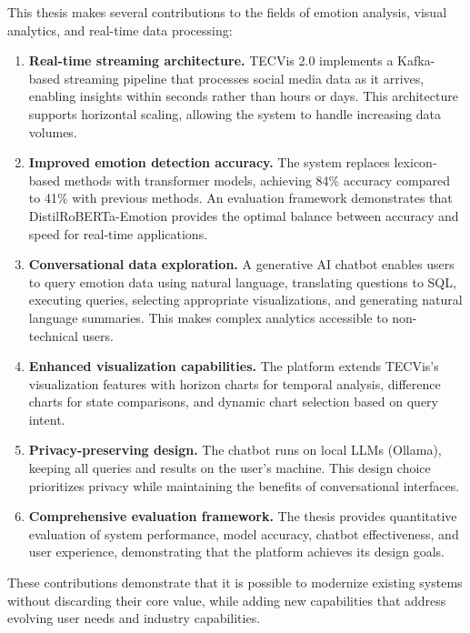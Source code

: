 This thesis makes several contributions to the fields of emotion analysis, visual analytics, and real-time data processing:

\begin{enumerate}
\item \textbf{Real-time streaming architecture.} TECVis 2.0 implements a Kafka-based streaming pipeline that processes social media data as it arrives, enabling insights within seconds rather than hours or days. This architecture supports horizontal scaling, allowing the system to handle increasing data volumes.

\item \textbf{Improved emotion detection accuracy.} The system replaces lexicon-based methods with transformer models, achieving 84\% accuracy compared to 41\% with previous methods. An evaluation framework demonstrates that DistilRoBERTa-Emotion provides the optimal balance between accuracy and speed for real-time applications.

\item \textbf{Conversational data exploration.} A generative AI chatbot enables users to query emotion data using natural language, translating questions to SQL, executing queries, selecting appropriate visualizations, and generating natural language summaries. This makes complex analytics accessible to non-technical users.

\item \textbf{Enhanced visualization capabilities.} The platform extends TECVis's visualization features with horizon charts for temporal analysis, difference charts for state comparisons, and dynamic chart selection based on query intent.

\item \textbf{Privacy-preserving design.} The chatbot runs on local LLMs (Ollama), keeping all queries and results on the user's machine. This design choice prioritizes privacy while maintaining the benefits of conversational interfaces.

\item \textbf{Comprehensive evaluation framework.} The thesis provides quantitative evaluation of system performance, model accuracy, chatbot effectiveness, and user experience, demonstrating that the platform achieves its design goals.
\end{enumerate}

These contributions demonstrate that it is possible to modernize existing systems without discarding their core value, while adding new capabilities that address evolving user needs and industry capabilities.


